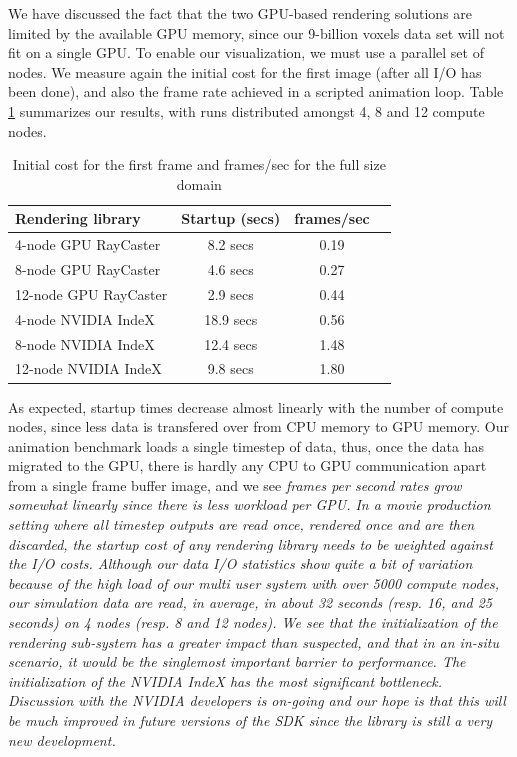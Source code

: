 \documentclass[5p,times]{elsarticle}
\begin{document}
We have discussed the fact that the two GPU-based rendering solutions
are limited by the available GPU memory, since our 9-billion voxels data set will
not fit on a single GPU. To enable our visualization, we must use a parallel 
set of nodes. We measure again the initial cost for the first image
(after all I/O has been done), and also the frame rate achieved in a scripted
animation loop. Table \ref{tab:parallelgpu-tab} summarizes our results, with runs distributed amongst 4, 8 and 12 compute nodes.

\begin{table}[htb]
  \centering
  \caption{
    Initial cost for the first frame and frames/sec for the full size domain
  }
  \label{tab:parallelgpu-tab}

  \begin{tabular}{lccc}
    \hline
    Rendering library & Startup (secs) & frames/sec\\
    \hline
     4-node GPU RayCaster & 8.2 secs &  0.19 \\
     8-node GPU RayCaster & 4.6 secs &  0.27 \\
    12-node GPU RayCaster & 2.9 secs &  0.44 \\
    \hline
     4-node NVIDIA IndeX & 18.9 secs &  0.56\\
     8-node NVIDIA IndeX & 12.4 secs &  1.48\\
    12-node NVIDIA IndeX & 9.8 secs &  1.80\\
    \hline

  \end{tabular}
\end{table}

As expected, startup times decrease almost linearly with the number of compute nodes,
since less data is transfered over from CPU memory to GPU memory. Our animation benchmark
loads a single timestep of data, thus, once the data has migrated to the GPU, there is
hardly any CPU to GPU communication apart from a single frame buffer image, and
we see \it{frames per second} \rm rates grow somewhat linearly since there is less workload per GPU. 
In a movie production setting where all timestep outputs are read once, rendered once
and are then discarded, the startup cost of any rendering library needs to be weighted
against the I/O costs. Although our data I/O statistics show quite a bit of variation
because of the high load of our multi user system with over 5000 compute nodes,
our simulation data are read, \it{in average}\rm, in about 32 seconds (resp. 16, and 25 seconds)
on 4 nodes (resp. 8 and 12 nodes). We see that the initialization of the rendering sub-system
has a greater impact than suspected, and that in an \it{in-situ} \rm scenario,
it would be the singlemost important barrier to performance. The initialization of
the NVIDIA IndeX has the most significant bottleneck. Discussion with the NVIDIA developers
is on-going and our hope is that this will be much improved in future versions of the
SDK since the library is still a very new development.
\end{document}

